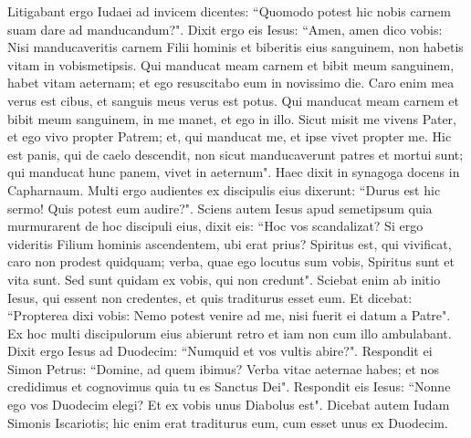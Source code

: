 \begin{biblechapter}
\verse Litigabant ergo Iudaei ad invicem dicentes: “Quomodo potest hic nobis carnem suam dare ad manducandum?". 
\verse Dixit ergo eis Iesus: “Amen, amen dico vobis: Nisi manducaveritis carnem Filii hominis et biberitis eius sanguinem, non habetis vitam in vobismetipsis. 
\verse Qui manducat meam carnem et bibit meum sanguinem, habet vitam aeternam; et ego resuscitabo eum in novissimo die. 
\verse Caro enim mea verus est cibus, et sanguis meus verus est potus. 
\verse Qui manducat meam carnem et bibit meum sanguinem, in me manet, et ego in illo.  
\verse Sicut misit me vivens Pater, et ego vivo propter Patrem; et, qui manducat me, et ipse vivet propter me. 
\verse Hic est panis, qui de caelo descendit, non sicut manducaverunt patres et mortui sunt; qui manducat hunc panem, vivet in aeternum". 
\verse Haec dixit in synagoga docens in Capharnaum. 
\verse Multi ergo audientes ex discipulis eius dixerunt: “Durus est hic sermo! Quis potest eum audire?". 
\verse Sciens autem Iesus apud semetipsum quia murmurarent de hoc discipuli eius, dixit eis: “Hoc vos scandalizat? 
\verse Si ergo videritis Filium hominis ascendentem, ubi erat prius? 
\verse Spiritus est, qui vivificat, caro non prodest quidquam; verba, quae ego locutus sum vobis, Spiritus sunt et vita sunt.  
\verse Sed sunt quidam ex vobis, qui non credunt". Sciebat enim ab initio Iesus, qui essent non credentes, et quis traditurus esset eum. 
\verse Et dicebat: “Propterea dixi vobis: Nemo potest venire ad me, nisi fuerit ei datum a Patre". 
\verse Ex hoc multi discipulorum eius abierunt retro et iam non cum illo ambulabant. 
\verse Dixit ergo Iesus ad Duodecim: “Numquid et vos vultis abire?". 
\verse Respondit ei Simon Petrus: “Domine, ad quem ibimus? Verba vitae aeternae habes;  
\verse et nos credidimus et cognovimus quia tu es Sanctus Dei". 
\verse Respondit eis Iesus: “Nonne ego vos Duodecim elegi? Et ex vobis unus Diabolus est".  
\verse Dicebat autem Iudam Simonis Iscariotis; hic enim erat traditurus eum, cum esset unus ex Duodecim. 
\end{biblechapter}


